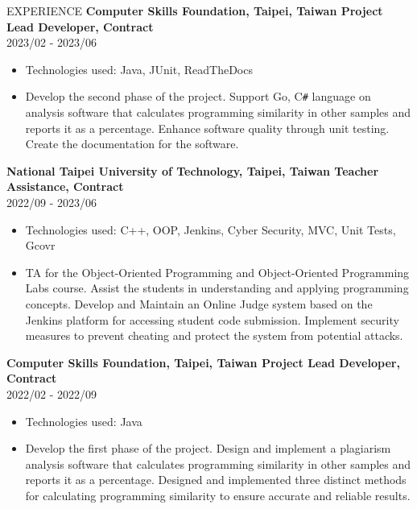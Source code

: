 \documentclass{resume} %
\begin{document}
\begin{rSection}{EXPERIENCE}
{\bf Computer Skills Foundation, Taipei, Taiwan \hfill {Project Lead Developer, Contract}} \\
2023/02 - 2023/06
    \begin{itemize}
        \item {Technologies used: Java, JUnit, ReadTheDocs}
        \item {Develop the second phase of the project. Support Go, C\verb|#| language on analysis software that calculates programming similarity in other samples and reports it as a percentage. Enhance software quality through unit testing. Create the documentation for the software.}
    \end{itemize}

{\bf National Taipei University of Technology, Taipei, Taiwan \hfill {Teacher Assistance, Contract}} \\
{2022/09 - 2023/06}
    \begin{itemize}
        \item {Technologies used: C++, OOP, Jenkins, Cyber Security, MVC, Unit Tests, Gcovr}
        \item {TA for the Object-Oriented Programming and Object-Oriented Programming Labs course. Assist the students in understanding and applying programming concepts. Develop and Maintain an Online Judge system based on the Jenkins platform for accessing student code submission. Implement security measures to prevent cheating and protect the system from potential attacks.}
    \end{itemize}
    
{\bf Computer Skills Foundation, Taipei, Taiwan \hfill {Project Lead Developer, Contract}} \\
2022/02 - 2022/09
    \begin{itemize}
        \item {Technologies used: Java}
        \item {Develop the first phase of the project. Design and implement a plagiarism analysis software that calculates programming similarity in other samples and reports it as a percentage. Designed and implemented three distinct methods for calculating programming similarity to ensure accurate and reliable results.}
    \end{itemize}
\end{rSection} 
\end{document}
